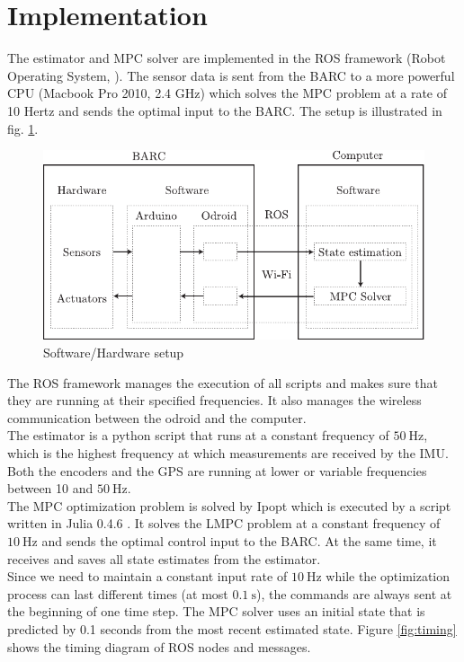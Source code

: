\section{Implementation}\label{sec:implementation}
The estimator and MPC solver are implemented in the ROS framework (Robot Operating System, \cite{ros}). The sensor data is sent from the BARC to a more powerful CPU (Macbook Pro 2010, 2.4 GHz) which solves the MPC problem at a rate of 10 Hertz and sends the optimal input to the BARC. The setup is illustrated in fig. \ref{fig:architecture}.
\begin{figure}[ht]
    \centering
      \includegraphics{../../Figures/Illustrator/Architecture.pdf}
    \caption{Software/Hardware setup}
    \label{fig:architecture}
\end{figure}
The ROS framework manages the execution of all scripts and makes sure that they are running at their specified frequencies. It also manages the wireless communication between the odroid and the computer.\\
The estimator is a python script that runs at a constant frequency of $\SI{50}{\hertz}$, which is the highest frequency at which measurements are received by the IMU. Both the encoders and the GPS are running at lower or variable frequencies between 10 and $\SI{50}{\hertz}$.\\
The MPC optimization problem is solved by Ipopt \cite{ipopt} which is executed by a script written in Julia 0.4.6 \cite{julia}. It solves the LMPC problem at a constant frequency of $\SI{10}{\hertz}$ and sends the optimal control input to the BARC. At the same time, it receives and saves all state estimates from the estimator.\\
Since we need to maintain a constant input rate of $\SI{10}{\hertz}$ while the optimization process can last different times (at most $\SI{0.1}{\second}$), the commands are always sent at the beginning of one time step. The MPC solver uses an initial state that is predicted by 0.1 seconds from the most recent estimated state. Figure \ref{fig:timing} shows the timing diagram of ROS nodes and messages.
